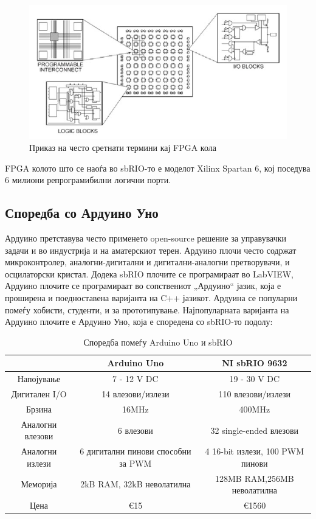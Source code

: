 \documentclass{article}
\begin{document}
\begin{figure}[h]
\includegraphics[width=0.75\linewidth]{fpga_diagram.jpg}
\centering
\caption{Приказ на често сретнати термини кај FPGA кола}
\label{fig:fpga_diagram_jpg}
\end{figure}

FPGA колото што се наоѓа во sbRIO-то е моделот Xilinx Spartan 6, кој поседува 6 милиони репрограмибилни логични порти.
\subsection{Споредба со Ардуино Уно}
Ардуино претставува често применето open-source решение за управувачки задачи и во индустрија и на аматерскиот терен. Ардуино плочи често содржат микроконтролер, аналогни-дигитални и дигитални-аналогни претворувачи, и осцилаторски кристал. Додека sbRIO плочите се програмираат во LabVIEW, Ардуино плочите се програмираат во сопствениот „Ардуино“ јазик, која е проширена и поедноставена варијанта на C++ јазикот. Ардуина се популарни помеѓу хобисти, студенти, и за прототипување. Најпопуларната варијанта на Ардуино плочите е Ардуино Уно, која е споредена со sbRIO-то подолу:    
\begin{table}[h]
\caption{Споредба помеѓу Arduino Uno и sbRIO}
\label{tab:title}

\begin{center}
\begin{tabular}{||c|c|c||}
\hline
  & Arduino Uno & NI sbRIO 9632 \\ [0.75ex]
\hline \hline
Напојување & 7 - 12 V DC & 19 - 30 V DC \\
\hline 
Дигитален I/O & 14 влезови/излези & 110 влезови/излези \\
\hline
Брзина & 16MHz & 400MHz \\

\hline
Аналогни влезови & 6 влезови & 32 single-ended влезови \\
\hline
Аналогни излези & 6 дигитални пинови способни за PWM & 4 16-bit излези, 100 PWM пинови \\
\hline
Меморија & 2kB RAM, 32kB неволатилна & 128MB RAM,256MB неволатилна \\ 
\hline
Цена & €15 & €1560 \\ [0.5ex]
\hline
\end{tabular}
\end{center}
\end{table}
\end{document}
